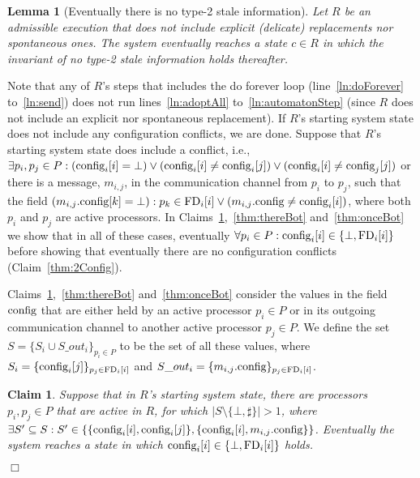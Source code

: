 \documentclass[11pt]{article}
\newtheorem{lemma}[theorem]{Lemma}
\newtheorem{claim}[theorem]{Claim}
\newenvironment{proof}{\noindent{\bf Proof.}}{\hfill$\Box$}
\begin{document}
\begin{lemma}[Eventually there is no type-2 stale information]
\label{thm:noConflict}
Let $R$ be an admissible execution that does not include explicit (delicate) replacements nor spontaneous ones. The system eventually reaches  a state $c \in R$ in which the invariant of no type-2 stale information holds thereafter. 
\end{lemma}
\begin{proof}
Note that any of $R$'s steps that includes the do forever loop (line~\ref{ln:doForever} to~\ref{ln:send}) does not run lines~\ref{ln:adoptAll} to~\ref{ln:automatonStep} (since $R$ does not include an explicit nor spontaneous replacement). If $R$'s starting system state does not include any configuration conflicts, we are done. Suppose that $R$'s starting system state does include a conflict, i.e., $\exists p_i, p_j \in P: (\textnormal{config}_i[i] = \bot)  \lor  (\textnormal{config}_i[i] \neq \textnormal{config}_i[j]) \lor (\textnormal{config}_i[i] \neq \textnormal{config}_j[j])$ or there is a message, $m_{i,j}$, in the communication channel from $p_i$ to $p_j$, such that the field $(m_{i,j}.\textnormal{config}[k] = \bot) : p_k \in \textnormal{FD}_i[i] \lor (m_{i,j}.\textnormal{config}\neq\textnormal{config}_i[i])$, where both $p_i$ and $p_j$ are active processors. 
In Claims~\ref{thm:thereBotSim},~\ref{thm:thereBot} and~\ref{thm:onceBot} we show that in all of these cases, eventually $\forall p_i \in P: \textnormal{config}_i[i] \in \{ \bot, \textnormal{FD}_i[i] \}$ before showing that eventually there are no configuration conflicts  (Claim~\ref{thm:2Config}).



Claims~\ref{thm:thereBotSim},~\ref{thm:thereBot} and~\ref{thm:onceBot} consider the values in the field $\textnormal{config}$ that are either held by an active processor $p_i \in P$ or in its outgoing communication channel to another active processor $p_j \in P$. We define the set $S= \{ S_i \cup S\_out_{i} \}_{p_i \in P}$ to be the set of all these values, where $S_i = \{ \textnormal{config}_i[j] \}_{p_j \in \textnormal{FD}_i[i]}$ and $S\_out_{i} = \{ m_{i,j}.\textnormal{config} \}_{p_j \in \textnormal{FD}_i[i]}$. 





\begin{claim}
\label{thm:thereBotSim}
Suppose that in $R$'s starting system state, there are  processors $p_i, p_j \in P$ that are active in $R$, for which $|S  \setminus \{ \bot, \sharp \} |>1$, where $\exists S' \subseteq S : S' \in \{ \{ \textnormal{config}_i[i], \textnormal{config}_i[j] \}, \{ \textnormal{config}_i[i], m_{i,j}.\textnormal{config} \} \}$. Eventually the system reaches a state in which $\textnormal{config}_i[i] \in \{ \bot, \textnormal{FD}_i[i] \}$ holds. 
\end{claim} 



\end{proof}
\end{document}
